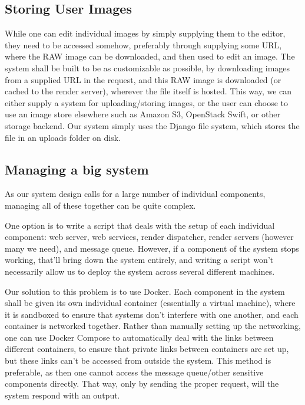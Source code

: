 \documentclass[11pt,a4paper]{article}
\begin{document}
\subsection{Storing User Images}
While one can edit individual images by simply supplying them to the editor, they need to be accessed somehow,
preferably through supplying some URL, where the RAW image can be downloaded, and then used to edit an image.
The system shall be built to be as customizable as possible, by downloading images from a supplied URL in the request,
and this RAW image is downloaded (or cached to the render server), wherever the file itself is hosted. This way, we can
either supply a system for uploading/storing images, or the user can choose to use an image store elsewhere such as Amazon
S3, OpenStack Swift, or other storage backend. Our system simply uses the Django file system, which stores the file in an
uploads folder on disk.



\subsection{Managing a big system}
As our system design calls for a large number of individual components, managing all of these together can be quite complex.

One option is to write a script that deals with the setup of each individual component: web server, web services, render dispatcher, render servers (however many we need),
and message queue. However, if a component of the system stops working, that'll bring down the system entirely, and writing a script won't necessarily allow us to deploy the system
across several different machines.

Our solution to this problem is to use Docker. Each component in the system shall be given its own individual container (essentially a virtual machine), where
it is sandboxed to ensure that systems don't interfere with one another, and each container is networked together. Rather than manually setting up the networking,
one can use Docker Compose to automatically deal with the links between different containers, to ensure that private links between containers are set up, but these links
can't be accessed from outside the system. This method is preferable, as then one cannot access the message queue/other sensitive components directly. That way, only by sending
the proper request, will the system respond with an output.
\end{document}
